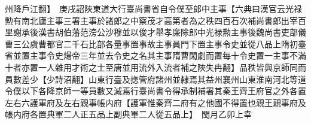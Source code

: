 州降戶江翻】　庚戌詔陜東道大行臺尚書省自令僕至郎中主事【六典曰漢官云光禄勲有南北廬主事三署主事於諸郎之中察茂才高第者為之秩四百石次補尚書郎出宰百里謝承後漢書胡伯藩范滂公沙穆並以俊才舉孝廉除郎中光禄勲主事後魏尚書吏部儀曹三公虞曹都官二千石比部各量事置事故主事員門下置主事令史並從八品上隋初臺省並置主事令史煬帝三年並去令史之名其主事隋曹閑劇而置每十令史置一主事不滿十者亦置一人雜用才術之士至唐並用流外入流者補之陜失冉翻】品秩皆與京師同而員數差少【少詩沼翻】山東行臺及揔管府諸州並隸焉其益州襄州山東淮南河北等道令僕以下各降京師一等員數又減焉行臺尚書令得承制補署其秦王齊王府官之外各置左右六護軍府及左右親事帳内府【護軍惟秦齊二府有之他國不得置也親王親事府及帳内府各置典軍二人正五品上副典軍二人從五品上】　閠月乙卯上幸